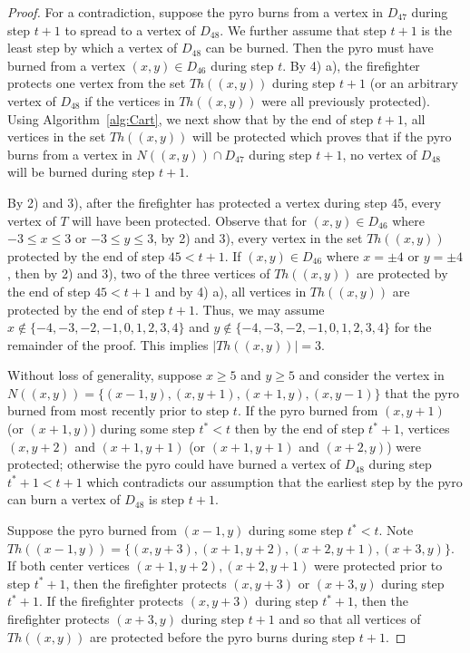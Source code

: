 \documentclass[12pt]{article}
\begin{document}
\begin{proof}  For a contradiction, suppose the pyro burns from a vertex in $D_{47}$ during step $t+1$ to spread to a vertex of $D_{48}$.  We further assume that step $t+1$ is the least step by which a vertex of $D_{48}$ can be burned.  Then the pyro must have burned from a vertex $(x,y) \in D_{46}$ during step $t$.  By 4) a), the firefighter protects one vertex from the set $Th((x,y))$ during step $t+1$ (or an arbitrary vertex of $D_{48}$ if the vertices in $Th((x,y))$ were all previously protected).  Using Algorithm~\ref{alg:Cart}, we next show that by the end of step $t+1$, all vertices in the set $Th((x,y))$ will be protected which proves that if the pyro burns from a vertex in $N((x,y)) \cap D_{47}$ during step $t+1$, no vertex of $D_{48}$ will be burned during step $t+1$.\medskip

By 2) and 3), after the firefighter has protected a vertex during step $45$, every vertex of $T$ will have been protected.  Observe that for $(x,y) \in D_{46}$ where $-3 \leq x \leq 3$ or $-3 \leq y \leq 3$, by 2) and 3), every vertex in the set $Th((x,y))$ protected by the end of step $45 < t+1$.  If $(x,y) \in D_{46}$ where $x = \pm 4$ or $y=\pm 4$, then by 2) and 3), two of the three vertices of $Th((x,y))$ are protected by the end of step $45< t+1$ and by 4) a), all vertices in $Th((x,y))$ are protected by the end of step $t+1$.  Thus, we may assume $x \notin \{-4,-3,-2,-1,0,1,2,3,4\}$ and $y \notin \{-4,-3,-2,-1,0,1,2,3,4\}$ for the remainder of the proof.  This implies $|Th((x,y))| = 3$.

Without loss of generality, suppose $x \geq 5$ and $y \geq 5$ and consider the vertex in $N((x,y)) = \{(x-1,y),(x,y+1),(x+1,y),(x,y-1)\}$ that the pyro burned from most recently prior to step $t$.  If the pyro burned from $(x,y+1)$ (or $(x+1,y)$) during some step $t^* < t$ then by the end of step $t^*+1$, vertices $(x,y+2)$ and $(x+1,y+1)$ (or $(x+1,y+1)$ and $(x+2,y)$) were protected; otherwise the pyro could have burned a vertex of $D_{48}$ during step $t^*+1 < t+1$ which contradicts our assumption that the earliest step by the pyro can burn a vertex of $D_{48}$ is step $t+1$.  

Suppose the pyro burned from $(x-1,y)$ during some step $t^*<t$.  Note $Th((x-1,y)) = \{(x,y+3),(x+1,y+2),(x+2,y+1),(x+3,y)\}$.  If both center vertices $(x+1,y+2),(x+2,y+1)$ were protected prior to step $t^*+1$, then the firefighter protects $(x,y+3)$ or $(x+3,y)$ during step $t^*+1$.  If the firefighter protects $(x,y+3)$ during step $t^*+1$, then the firefighter protects $(x+3,y)$ during step $t+1$ and so that all vertices of $Th((x,y))$ are protected before the pyro burns during step $t+1$. 


\end{proof}
\end{document}
